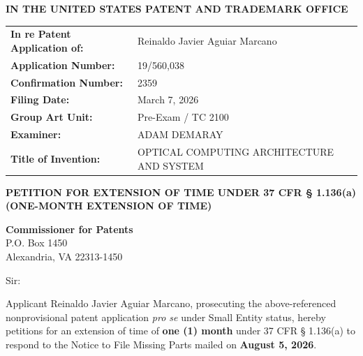 \documentclass[11pt,letterpaper]{article}
\begin{document}
\thispagestyle{empty}

\begin{center}
    \large\textbf{IN THE UNITED STATES PATENT AND TRADEMARK OFFICE} \\
\end{center}

\vspace{0.3cm}
\noindent\begin{tabular}{p{2.3in}p{4.0in}}
\textbf{In re Patent Application of:} & Reinaldo Javier Aguiar Marcano \\
\textbf{Application Number:} & 19/560,038 \\
\textbf{Confirmation Number:} & 2359 \\
\textbf{Filing Date:} & March 7, 2026 \\
\textbf{Group Art Unit:} & Pre-Exam / TC 2100 \\
\textbf{Examiner:} & ADAM DEMARAY \\
\textbf{Title of Invention:} & OPTICAL COMPUTING ARCHITECTURE AND SYSTEM \\
\end{tabular}

\vspace{0.8cm}
\begin{center}
    \textbf{\large PETITION FOR EXTENSION OF TIME UNDER 37 CFR \S{} 1.136(a) \\
    (ONE-MONTH EXTENSION OF TIME)}
\end{center}

\vspace{0.4cm}
\noindent\textbf{Commissioner for Patents} \\
\noindent P.O. Box 1450 \\
\noindent Alexandria, VA 22313-1450

\vspace{0.4cm}
\noindent Sir:

Applicant Reinaldo Javier Aguiar Marcano, prosecuting the above-referenced nonprovisional patent application \textit{pro se} under Small Entity status, hereby petitions for an extension of time of \textbf{one (1) month} under 37 CFR \S{} 1.136(a) to respond to the Notice to File Missing Parts mailed on \textbf{August 5, 2026}.
\end{document}
